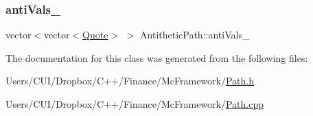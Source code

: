 \subsubsection{\texorpdfstring{anti\+Vals\+\_\+}{antiVals\_}}
{\footnotesize\ttfamily vector$<$vector$<$\hyperlink{_name_def_8h_a642a6c5fd87319d922637de0e0bb0305}{Quote}$>$ $>$ Antithetic\+Path\+::anti\+Vals\+\_\+\hspace{0.3cm}{\ttfamily [private]}}



The documentation for this class was generated from the following files\+:\begin{DoxyCompactItemize}
\item 
Users/\+C\+U\+I/\+Dropbox/\+C++/\+Finance/\+Mc\+Framework/\hyperlink{_path_8h}{Path.\+h}\item 
Users/\+C\+U\+I/\+Dropbox/\+C++/\+Finance/\+Mc\+Framework/\hyperlink{_path_8cpp}{Path.\+cpp}\end{DoxyCompactItemize}
